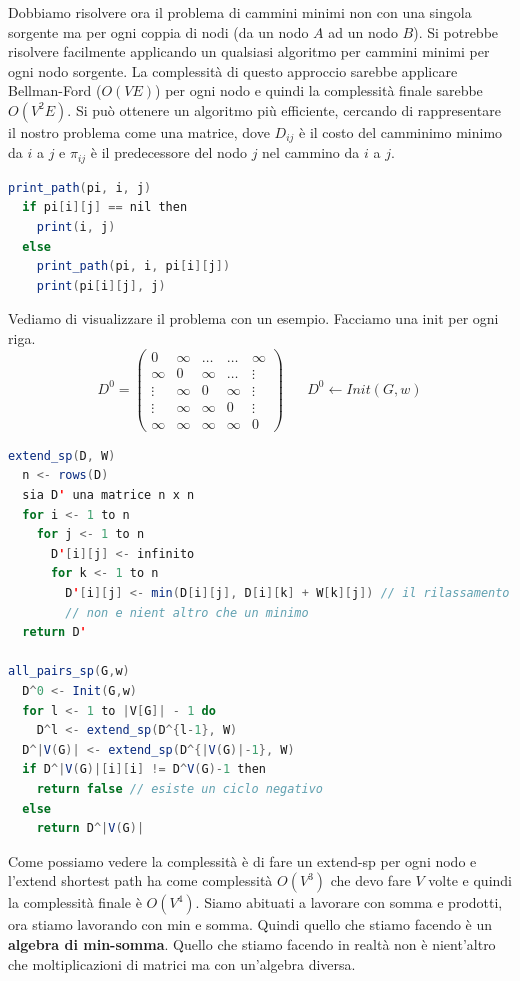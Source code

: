 \documentclass[a4paper]{article}
\begin{document}
Dobbiamo risolvere ora il problema di cammini minimi non con una singola sorgente ma per ogni coppia di nodi (da un nodo $A$ ad un nodo $B$).
Si potrebbe risolvere facilmente applicando un qualsiasi algoritmo per cammini minimi per ogni nodo sorgente. La complessità di questo approccio sarebbe applicare Bellman-Ford ($O(VE)$) 
per ogni nodo e quindi la complessità finale sarebbe $O(V^2E)$.
Si può ottenere un algoritmo più efficiente, cercando di rappresentare il nostro problema come una matrice, dove $D_{ij}$ è il costo del camminimo minimo da $i$ a $j$ e $\pi_{ij}$ è il predecessore del nodo $j$ nel cammino da $i$ a $j$.
\begin{lstlisting}[language=Scala]
print_path(pi, i, j)
  if pi[i][j] == nil then
    print(i, j)
  else
    print_path(pi, i, pi[i][j])
    print(pi[i][j], j)
\end{lstlisting}
\noindent
Vediamo di visualizzare il problema con un esempio. Facciamo una init per ogni riga.
\[
D^0 = \begin{pmatrix}
  0 & \infty & \dots & \dots & \infty\\
  \infty & 0 & \infty & \dots & \vdots\\
  \vdots & \infty & 0 & \infty & \vdots\\
  \vdots & \infty & \infty & 0 & \vdots\\
  \infty & \infty & \infty & \infty & 0
\end{pmatrix} \; \; \; \; \; \; D^0 \leftarrow Init(G,w)
\]
\begin{lstlisting}[language=Scala]
extend_sp(D, W)
  n <- rows(D)
  sia D' una matrice n x n
  for i <- 1 to n 
    for j <- 1 to n
      D'[i][j] <- infinito 
      for k <- 1 to n
        D'[i][j] <- min(D[i][j], D[i][k] + W[k][j]) // il rilassamento
        // non e nient altro che un minimo
  return D'

all_pairs_sp(G,w) 
  D^0 <- Init(G,w)
  for l <- 1 to |V[G]| - 1 do
    D^l <- extend_sp(D^{l-1}, W)
  D^|V(G)| <- extend_sp(D^{|V(G)|-1}, W)
  if D^|V(G)|[i][i] != D^V(G)-1 then
    return false // esiste un ciclo negativo
  else
    return D^|V(G)|
\end{lstlisting}
\noindent
Come possiamo vedere la complessità è di fare un extend-sp per ogni nodo e l'extend shortest path ha come complessità $O(V^3)$
che devo fare $V$ volte e quindi la complessità finale è $O(V^4)$.
Siamo abituati a lavorare con somma e prodotti, ora stiamo lavorando con min e somma. Quindi quello che stiamo facendo è un \textbf{algebra di min-somma}.
Quello che stiamo facendo in realtà non è nient'altro che moltiplicazioni di matrici ma con un'algebra diversa.
\end{document}
